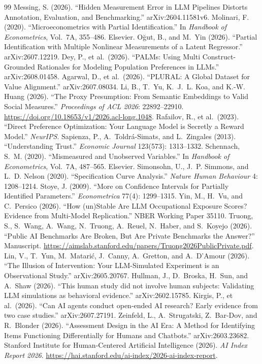 \documentclass[10pt,letterpaper]{article}
\begin{document}
\begin{thebibliography}{99}
 Messing, S. (2026). ``Hidden Measurement Error in LLM Pipelines Distorts Annotation, Evaluation, and Benchmarking.'' arXiv:2604.11581v6.
 Molinari, F. (2020). ``Microeconometrics with Partial Identification.'' In \textit{Handbook of Econometrics}, Vol.~7A, 355--486. Elsevier.
 O\u{g}ut, B., and M.~Yin (2026). ``Partial Identification with Multiple Nonlinear Measurements of a Latent Regressor.'' arXiv:2607.12219.
 Dey, P., et al.\ (2026). ``PALMs: Using Multi Construct-Grounded Rationales for Modeling Population Preferences in LLMs.'' arXiv:2608.01458.
 Agarwal, D., et al.\ (2026). ``PLURAL: A Global Dataset for Value Alignment.'' arXiv:2607.08034.
 Li, B., T.~Yu, K.~J.~L. Koa, and K.-W. Huang (2026). ``The Proxy Presumption: From Semantic Embeddings to Valid Social Measures.'' \textit{Proceedings of ACL 2026}: 22892--22910. \url{https://doi.org/10.18653/v1/2026.acl-long.1048}.
 Rafailov, R., et al.\ (2023). ``Direct Preference Optimization: Your Language Model is Secretly a Reward Model.'' \textit{NeurIPS}.
 Sapienza, P., A.~Toldr\'a-Simats, and L.~Zingales (2013). ``Understanding Trust.'' \textit{Economic Journal} 123(573): 1313--1332.
 Schennach, S.~M. (2020). ``Mismeasured and Unobserved Variables.'' In \textit{Handbook of Econometrics}, Vol.~7A, 487--565. Elsevier. %
 Simonsohn, U., J.~P. Simmons, and L.~D. Nelson (2020). ``Specification Curve Analysis.'' \textit{Nature Human Behaviour} 4: 1208--1214.
 Stoye, J. (2009). ``More on Confidence Intervals for Partially Identified Parameters.'' \textit{Econometrica} 77(4): 1299--1315.
 Yin, M., H.~Vu, and C.~Persico (2026). ``How (un)Stable Are LLM Occupational Exposure Scores? Evidence from Multi-Model Replication.'' NBER Working Paper 35110.
 Truong, S., S.~Wang, A.~Wang, N.~Truong, A.~Reuel, N.~Haber, and S.~Koyejo (2026). ``Public AI Benchmarks Are Broken, But Are Private Benchmarks the Answer?'' Manuscript. \url{https://aimslab.stanford.edu/papers/Truong2026PublicPrivate.pdf}.
 Lin, V., T.~Yun, M.~Matari\'c, J.~Canny, A.~Gretton, and A.~D'Amour (2026). ``The Illusion of Intervention: Your LLM-Simulated Experiment is an Observational Study.'' arXiv:2605.20767.
 Hullman, J., D.~Broska, H.~Sun, and A.~Shaw (2026). ``This human study did not involve human subjects: Validating LLM simulations as behavioral evidence.'' arXiv:2602.15785.
 Kirgis, P., et al.\ (2026). ``Can AI agents conduct open-ended AI research? Early evidence from two case studies.'' arXiv:2607.27191.
 Zeinfeld, L., A.~Strugatski, Z.~Bar-Dov, and R.~Blonder (2026). ``Assessment Design in the AI Era: A Method for Identifying Items Functioning Differentially for Humans and Chatbots.'' arXiv:2603.23682.
 Stanford Institute for Human-Centered Artificial Intelligence (2026). \textit{AI Index Report 2026}. \url{https://hai.stanford.edu/ai-index/2026-ai-index-report}.
\end{thebibliography}
\end{document}
